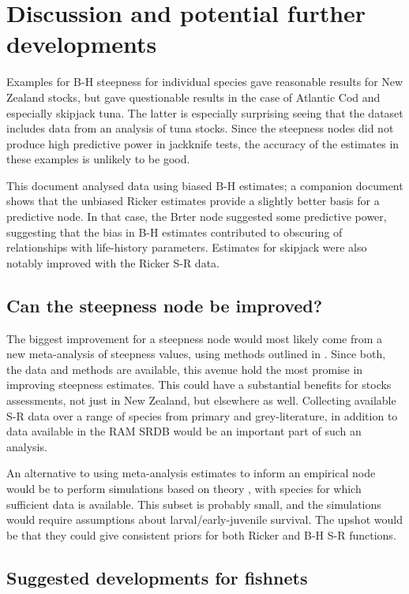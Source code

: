 \documentclass{dragonfly-report}\usepackage[]{graphicx}\usepackage[]{color}
\begin{document}
\section{Discussion and potential further developments}

Examples for B-H steepness for individual species gave reasonable results for New Zealand stocks, but gave questionable results in the case of Atlantic Cod and especially skipjack tuna. The latter is especially surprising seeing that the dataset includes data from an analysis of tuna stocks. Since the steepness nodes did not produce high predictive power in jackknife tests, the accuracy of the estimates in these examples is unlikely to be good.

This document analysed data using biased B-H estimates; a companion document shows that the unbiased Ricker estimates provide a slightly better basis for a predictive node. In that case, the Brter node suggested some predictive power, suggesting that the bias in B-H estimates contributed to obscuring of relationships with life-history parameters. Estimates for skipjack were also notably improved with the Ricker S-R data.

\subsection{Can the steepness node be improved?}

The biggest improvement for a steepness node would most likely come from a new meta-analysis of steepness values, using methods outlined in \citet{michielsens_2004_bayesian}. Since both, the data and methods are available, this avenue hold the most promise in improving steepness estimates. This could have a substantial benefits for stocks assessments, not just in New Zealand, but elsewhere as well. Collecting available S-R data over a range of species from primary and grey-literature, in addition to data available in the RAM SRDB would be an important part of such an analysis.

An alternative to using meta-analysis estimates to inform an empirical node would be to perform simulations based on theory \citep{mangel_2010_reproductive, mangel2013perspective}, with species for which sufficient data is available. This subset is probably small, and the simulations would require assumptions about larval/early-juvenile survival. The upshot would be that they could give consistent priors for both Ricker and B-H S-R functions.

\subsection{Suggested developments for fishnets}
\end{document}
